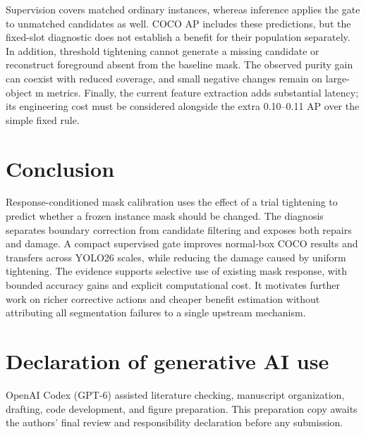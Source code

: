 \documentclass[times,twocolumn,final,authoryear]{elsarticle}
\begin{document}
Supervision covers matched ordinary instances, whereas inference applies the gate to unmatched candidates as well. COCO AP includes these predictions, but the fixed-slot diagnostic does not establish a benefit for their population separately. In addition, threshold tightening cannot generate a missing candidate or reconstruct foreground absent from the baseline mask. The observed purity gain can coexist with reduced coverage, and small negative changes remain on large-object m metrics. Finally, the current feature extraction adds substantial latency; its engineering cost must be considered alongside the extra 0.10--0.11 AP over the simple fixed rule.

\section{Conclusion}
Response-conditioned mask calibration uses the effect of a trial tightening to predict whether a frozen instance mask should be changed. The diagnosis separates boundary correction from candidate filtering and exposes both repairs and damage. A compact supervised gate improves normal-box COCO results and transfers across YOLO26 scales, while reducing the damage caused by uniform tightening. The evidence supports selective use of existing mask response, with bounded accuracy gains and explicit computational cost. It motivates further work on richer corrective actions and cheaper benefit estimation without attributing all segmentation failures to a single upstream mechanism.

\section*{Declaration of generative AI use}
OpenAI Codex (GPT-6) assisted literature checking, manuscript organization, drafting, code development, and figure preparation. This preparation copy awaits the authors' final review and responsibility declaration before any submission.



\end{document}
